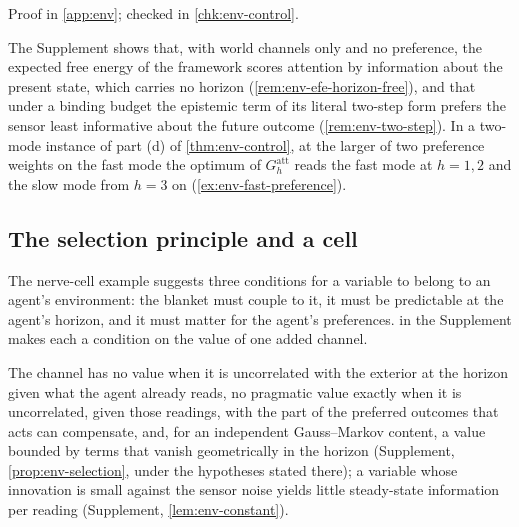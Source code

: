 Proof in \cref{app:env}; checked in \cref{chk:env-control}.

The Supplement shows that, with world channels only and no preference, the expected free energy of the framework scores attention by information about the present state, which carries no horizon (\cref{rem:env-efe-horizon-free}), and that under a binding budget the epistemic term of its literal two-step form prefers the sensor least informative about the future outcome (\cref{rem:env-two-step}). In a two-mode instance of part (d) of \cref{thm:env-control}, at the larger of two preference weights on the fast mode the optimum of $G^{\mathrm{att}}_h$ reads the fast mode at $h=1,2$ and the slow mode from $h=3$ on (\cref{ex:env-fast-preference}).

\subsection{The selection principle and a cell}\label{sec:env-selection}

The nerve-cell example suggests three conditions for a variable to belong to an agent's environment: the blanket must couple to it, it must be predictable at the agent's horizon, and it must matter for the agent's preferences.  in the Supplement makes each a condition on the value of one added channel.

The channel has no value when it is uncorrelated with the exterior at the horizon given what the agent already reads, no pragmatic value exactly when it is uncorrelated, given those readings, with the part of the preferred outcomes that acts can compensate, and, for an independent Gauss--Markov content, a value bounded by terms that vanish geometrically in the horizon (Supplement, \cref{prop:env-selection}, under the hypotheses stated there); a variable whose innovation is small against the sensor noise yields little steady-state information per reading (Supplement, \cref{lem:env-constant}).

